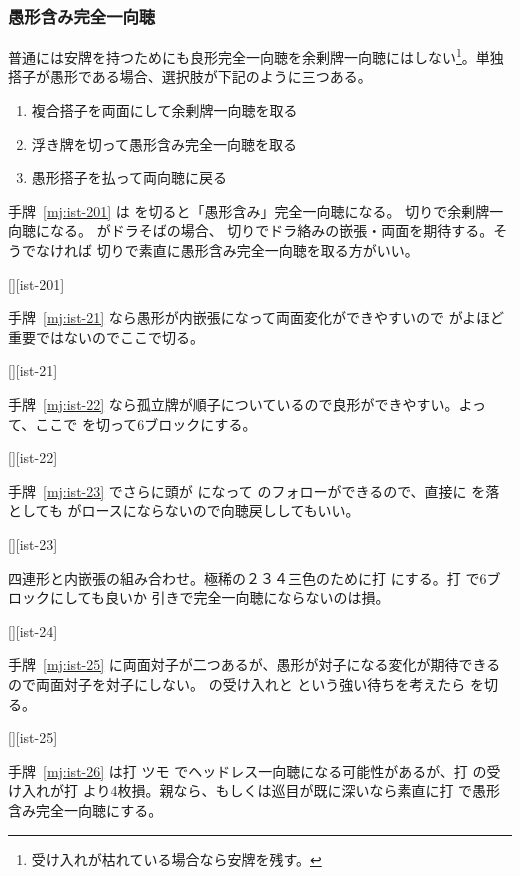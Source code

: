 \documentclass[../nankiru_main.tex]{subfiles}
\begin{document}
\subsubsection*{愚形含み完全一向聴}

普通には安牌を持つためにも良形完全一向聴を余剰牌一向聴にはしない\footnote{受け入れが枯れている場合なら安牌を残す。}\citep{gendai-iishanten-choice-1}。単独搭子が愚形である場合、選択肢が下記のように三つある。

\begin{enumerate}
\item 複合搭子を両面にして余剰牌一向聴を取る
\item 浮き牌を切って愚形含み完全一向聴を取る
\item 愚形搭子を払って両向聴に戻る
\end{enumerate}

手牌~\ref{mj:ist-201} は  を切ると「愚形含み」完全一向聴になる。 切りで余剰牌一向聴になる。 がドラそばの場合、 切りでドラ絡みの嵌張・両面を期待する。そうでなければ  切りで素直に愚形含み完全一向聴を取る方がいい。

[][ist-201]

手牌~\ref{mj:ist-21} なら愚形が内嵌張になって両面変化ができやすいので  がよほど重要ではないのでここで切る。

[][ist-21]

手牌~\ref{mj:ist-22} なら孤立牌が順子についているので良形ができやすい。よって、ここで  を切って6ブロックにする。

[][ist-22]

手牌~\ref{mj:ist-23} でさらに頭が  になって  のフォローができるので、直接に  を落としても  がロースにならないので向聴戻ししてもいい。

[][ist-23]

四連形と内嵌張の組み合わせ。極稀の２３４三色のために打  にする。打  で6ブロックにしても良いか  引きで完全一向聴にならないのは損。

[][ist-24]

手牌~\ref{mj:ist-25} に両面対子が二つあるが、愚形が対子になる変化が期待できるので両面対子を対子にしない。 の受け入れと  という強い待ちを考えたら  を切る。

[][ist-25]

手牌~\ref{mj:ist-26} は打  ツモ  でヘッドレス一向聴になる可能性があるが、打  の受け入れが打  より4枚損。親なら、もしくは巡目が既に深いなら素直に打  で愚形含み完全一向聴にする\citep[][p. 10]{uzaku-nankiru}。
\end{document}
